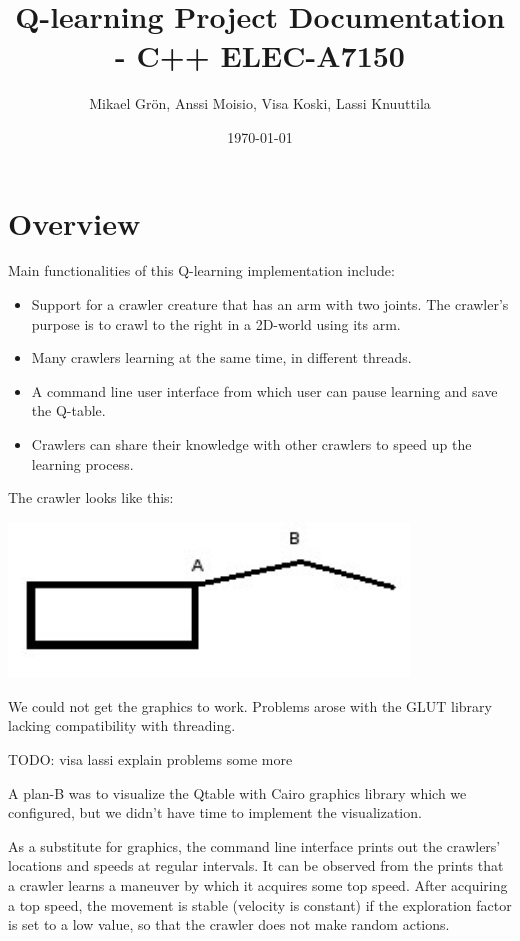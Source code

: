 \documentclass{article}
\author{Mikael Grön, Anssi Moisio, Visa Koski, Lassi Knuuttila}
\title{Q-learning Project Documentation - C++ ELEC-A7150}
\date{\today}
\begin{document}
\maketitle

\tableofcontents
\newpage

\section{Overview}
Main functionalities of this Q-learning implementation include:
\begin{itemize}
  \item Support for a crawler creature that has an arm with two joints. The
  crawler's purpose is to crawl to the right in a 2D-world using its arm.
  \item Many crawlers learning at the same time, in different threads.
  \item A command line user interface from which user can pause learning and
  save the Q-table.
  \item Crawlers can share their knowledge with other crawlers to speed up
  the learning process.
\end{itemize}

The crawler looks like this:

\includegraphics[width=0.8\textwidth]{simple_agent}

We could not get the graphics to work. Problems arose with
the GLUT library lacking compatibility with threading.

TODO: visa lassi explain problems some more

A plan-B was to visualize the Qtable with Cairo graphics library which we
configured, but we didn't have time to implement the visualization.

As a substitute for graphics, the command line interface prints out the
crawlers’ locations and speeds at regular intervals. It can be observed
from the prints that a crawler learns a maneuver by which it acquires some
top speed. After acquiring a top speed, the movement is stable (velocity is
constant) if the exploration factor is set to a low value, so that the crawler
does not make random actions.
\end{document}
